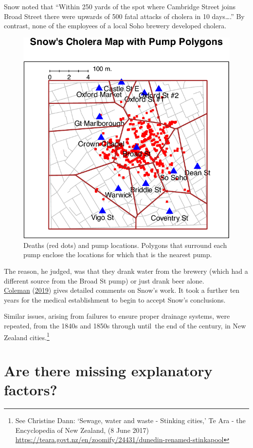 \documentclass[
  10pt,
  b5paper]{book}
\begin{document}
Snow noted that ``Within 250 yards of the spot where Cambridge Street joins Broad
Street there were upwards of 500 fatal attacks of cholera in 10 days\ldots{}.''
By contrast, none of the employees of a local Soho brewery developed cholera.

\begin{figure}[H]

{\centering \includegraphics[width=0.6\linewidth]{08-observational_files/figure-latex/pump-1} 

}

\caption{Deaths (red dots) and pump locations.  Polygons that surround
each pump enclose the locations for which that is the nearest pump.}\label{fig:pump}
\end{figure}

The reason, he judged, was that they drank water from the brewery (which had a
different source from the Broad St pump) or just drank beer alone.\\
\protect\hyperlink{ref-coleman2019causality}{Coleman} (\protect\hyperlink{ref-coleman2019causality}{2019}) gives detailed comments on Snow's work.
It took a further ten years for the medical establishment to begin to accept
Snow's conclusions.

Similar issues, arising from failures to ensure proper drainage systems,
were repeated, from the 1840s and 1850s through until~the end of the century,
in New Zealand cities.\footnote{See Christine Dann: `Sewage, water and waste - Stinking cities,' Te Ara - the Encyclopedia of New Zealand, (8 June 2017) \url{https://teara.govt.nz/en/zoomify/24431/dunedin-renamed-stinkapool}}

\hypertarget{are-there-missing-explanatory-factors}{%
\section{Are there missing explanatory factors?}\label{are-there-missing-explanatory-factors}}
\end{document}
